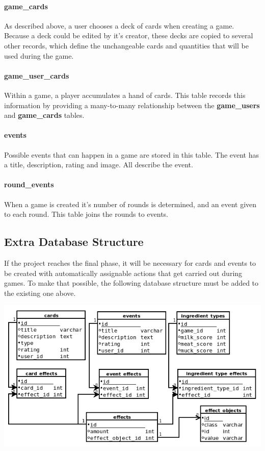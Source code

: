 \paragraph{game\_cards} As described above, a user chooses a deck of cards when creating a game. Because a deck could be edited by it's creator, these decks are copied to several other records, which define the unchangeable cards and quantities that will be used during the game.

\paragraph{game\_user\_cards} Within a game, a player accumulates a hand of cards. This table records this information by providing a many-to-many relationship between the \textbf{game\_users} and \textbf{game\_cards} tables.

\paragraph{events} Possible events that can happen in a game are stored in this table. The event has a title, description, rating and image. All describe the event.

\paragraph{round\_events} When a game is created it's number of rounds is determined, and an event given to each round. This table joins the rounds to events.

\subsection{Extra Database Structure}
If the project reaches the final phase, it will be necessary for cards and events to be created with automatically assignable actions that get carried out during games. To make that possible, the following database structure must be added to the existing one above.

\includegraphics[width=\textwidth]{Images/app3/extra-database}

